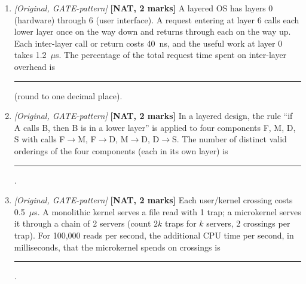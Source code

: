 \documentclass[11pt]{article}
\begin{document}
\begin{enumerate}
\item[\textbf{Q8}] \textit{[Original, GATE-pattern]} \textbf{[NAT, 2 marks]} A layered OS has layers 0 (hardware) through 6 (user interface). A request entering at layer 6 calls each lower layer once on the way down and returns through each on the way up. Each inter-layer call or return costs 40~ns, and the useful work at layer 0 takes 1.2~$\mu$s. The percentage of the total request time spent on inter-layer overhead is \rule{1.5cm}{0.4pt} (round to one decimal place).

\item[\textbf{Q9}] \textit{[Original, GATE-pattern]} \textbf{[NAT, 2 marks]} In a layered design, the rule ``if A calls B, then B is in a lower layer'' is applied to four components F, M, D, S with calls F$\to$M, F$\to$D, M$\to$D, D$\to$S. The number of distinct valid orderings of the four components (each in its own layer) is \rule{1.5cm}{0.4pt}.

\item[\textbf{Q10}] \textit{[Original, GATE-pattern]} \textbf{[NAT, 2 marks]} Each user/kernel crossing costs 0.5~$\mu$s. A monolithic kernel serves a file read with 1 trap; a microkernel serves it through a chain of 2 servers (count $2k$ traps for $k$ servers, 2 crossings per trap). For 100{,}000 reads per second, the additional CPU time per second, in milliseconds, that the microkernel spends on crossings is \rule{1.5cm}{0.4pt}.
\end{enumerate}
\end{document}
